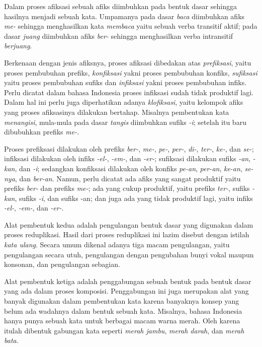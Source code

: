 Dalam proses afiksasi sebuah afiks diimbuhkan pada bentuk dasar sehingga hasilnya menjadi sebuah kata. Umpamanya pada dasar \textit{baca} diimbuhkan afiks \textit{me-} sehingga menghasilkan kata \textit{membaca} yaitu sebuah verba transitif aktif; pada dasar \textit{juang} diimbuhkan afiks \textit{ber-} sehingga menghasilkan verba intransitif \textit{berjuang}.

Berkenaan dengan jenis afiksnya, proses afiksasi dibedakan atas \textit{prefiksasi}, yaitu proses pembubuhan prefiks, \textit{konfiksasi} yakni proses pembubuhan konfiks, \textit{sufiksasi} yaitu proses pembubuhan sufiks dan \textit{infiksasi} yakni proses pembubuhan infiks. Perlu dicatat dalam bahasa Indonesia proses infiksasi sudah tidak produktif lagi. Dalam hal ini perlu juga diperhatikan adanya \textit{klofiksasi}, yaitu kelompok afiks yang proses afiksasinya dilakukan bertahap. Misalnya pembentukan kata \textit{menangisi}, mula-mula pada dasar \textit{tangis} diimbuhkan sufiks \textit{-i}; setelah itu baru dibubuhkan prefiks \textit{me-}.

Proses prefiksasi dilakukan oleh prefiks \textit{ber-}, \textit{me-}, \textit{pe-}, \textit{per-}, \textit{di-}, \textit{ter-}, \textit{ke-}, dan \textit{se-}; infiksasi dilakukan oleh infiks \textit{-el-}, \textit{-em-}, dan \textit{-er-}; sufiksasi dilakukan sufiks \textit{-an}, \textit{-kan}, dan \textit{-i}; sedangkan konfiksasi dilakukan oleh konfiks \textit{pe-an}, \textit{per-an}, \textit{ke-an}, \textit{se-nya}, dan \textit{ber-an}. Namun, perlu dicatat ada afiks yang sangat produktif yaitu prefiks \textit{ber-} dan prefiks \textit{me-}; ada yang cukup produktif, yaitu prefiks \textit{ter-}, sufiks \textit{-kan}, sufiks \textit{-i}, dan sufiks -an; dan juga ada yang tidak produktif lagi, yaitu infiks \textit{-el-}, \textit{-em-}, dan \textit{-er-}.

Alat pembentuk kedua adalah pengulangan bentuk dasar yang digunakan dalam proses reduplikasi. Hasil dari proses reduplikasi ini lazim disebut dengan istilah \textit{kata ulang}. Secara umum dikenal adanya tiga macam pengulangan, yaitu pengulangan secara utuh, pengulangan dengan pengubahan bunyi vokal maupun konsonan, dan pengulangan sebagian.

Alat pembentuk ketiga adalah penggabungan sebuah bentuk pada bentuk dasar yang ada dalam proses komposisi. Penggabungan ini juga merupakan alat yang banyak digunakan dalam pembentukan kata karena banyaknya konsep yang belum ada wadahnya dalam bentuk sebuah kata. Misalnya, bahasa Indonesia hanya punya sebuah kata untuk berbagai macam warna merah. Oleh karena itulah dibentuk gabungan kata seperti \textit{merah jambu}, \textit{merah darah}, dan \textit{merah bata}.

